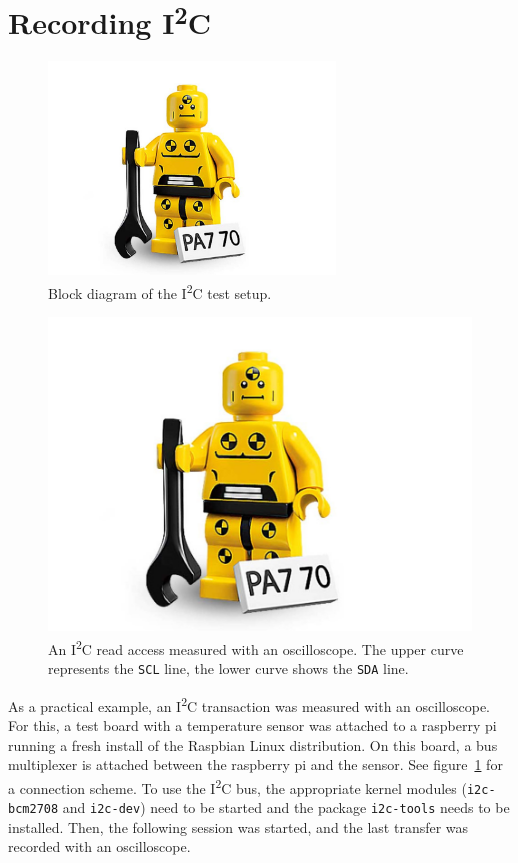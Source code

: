 \documentclass[journal]{IEEEtran}
\newcommand{\twi}{I\textsuperscript{2}C\xspace}
\newcommand{\sda}{\texttt{SDA}\xspace}
\newcommand{\scl}{\texttt{SCL}\xspace}
\begin{document}
\section{Recording \twi}
\begin{figure}[!t]
\centering
\includegraphics[width=3in]{dummy}
\caption{Block diagram of the \twi test setup.}
\label{i2c_setup}
\end{figure}
\begin{figure}[!t]
\centering
\includegraphics[width=\linewidth]{dummy}
\caption{An \twi read access measured with an oscilloscope. The upper curve represents the \scl line, the lower curve shows the \sda line.}
\label{i2c_transfer_measured}
\end{figure}
As a practical example, an \twi transaction was measured with an oscilloscope. For this, a test board with a temperature sensor was attached to a raspberry pi running a fresh install of the Raspbian Linux distribution. On this board, a bus multiplexer is attached between the raspberry pi and the sensor. See figure~\ref{i2c_setup} for a connection scheme.
To use the \twi bus, the appropriate kernel modules (\texttt{i2c-bcm2708} and \texttt{i2c-dev}) need to be started and the package \texttt{i2c-tools} needs to be installed. Then, the following session was started, and the last transfer was recorded with an oscilloscope.
\end{document}
